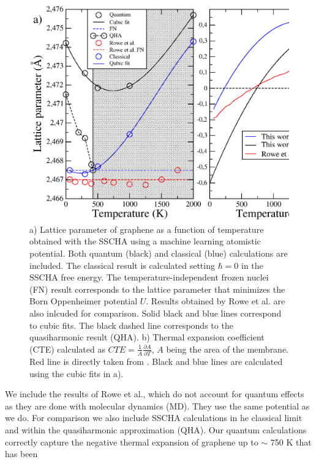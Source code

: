 \begin{figure}[ht]
\includegraphics[width=0.99\linewidth]{Figures/lattice.eps}
\caption[Lattice parameter of graphene as a function of temperature]{a) Lattice parameter of graphene as a function 
	of temperature obtained with the SSCHA using a machine learning atomistic potential. Both quantum (black) and 
	classical (blue) calculations are included. The classical result is calculated setting $\hbar=0$ in the SSCHA 
	free energy. The temperature-independent frozen nuclei (FN) result corresponds to the lattice parameter that 
	minimizes the Born Oppenheimer potential $U$. Results obtained by Rowe et al.\cite{rowe2018development} are 
	also inlcuded for comparison. Solid black and blue lines correspond to cubic fits. The black dashed line 
	corresponds to the quasiharmonic result (QHA). b) Thermal expansion coefficient (CTE) calculated as 
	$CTE=\frac{1}{A}\frac{\partial A}{\partial T}$, $A$ being the area of the membrane. Red line is directly 
	taken from \cite{rowe2018development}. Black and blue lines are calculated using the cubic fits in a).}
\label{lattice}
\end{figure}
We include the results of Rowe et al.\cite{rowe2018development}, which do not account for quantum effects as they 
are done with molecular dynamics (MD). They use the same potential as we do. For comparison we also include SSCHA 
calculations in he classical limit and within the quasiharmonic approximation\cite{bonini2007phonon} (QHA). Our 
quantum calculations correctly capture the negative thermal expansion of graphene up to $\sim$ 750 K that has been 
